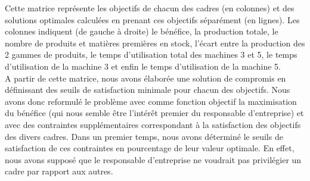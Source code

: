\documentclass[12pt]{article}
\begin{document}
Cette matrice représente les objectifs de chacun des cadres (en colonnes) et des solutions optimales calculées en prenant ces objectifs séparément (en lignes). Les colonnes indiquent (de gauche à droite) le bénéfice, la production totale, le nombre de produits et matières premières en stock, l'écart entre la production des 2 gammes de produits, le temps d'utilisation total des machines 3 et 5, le temps d'utilisation de la machine 3 et enfin le temps d'utilisation de la machine 5.\\

A partir de cette matrice, nous avons élaborée une solution de compromis en définissant des seuils de satisfaction minimale pour chacun des objectifs. Nous avons donc reformulé le problème avec comme fonction objectif la maximisation du bénéfice (qui nous semble être l'intérêt premier du responsable d'entreprise) et avec des contraintes supplémentaires correspondant à la satisfaction des objectifs des divers cadres. Dans un premier temps, nous avons déterminé le seuils de satisfaction de ces contraintes en pourcentage de leur valeur optimale. En effet, nous avons supposé que le responsable d'entreprise ne voudrait pas privilégier un cadre par rapport aux autres.
 
\end{document}
